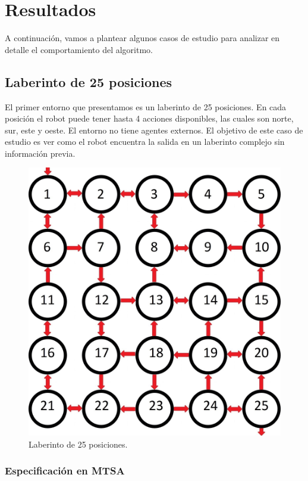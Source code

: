 \chapter{Resultados}

A continuación, vamos a plantear algunos casos de estudio para analizar en detalle el comportamiento del algoritmo.

\section{Laberinto de 25 posiciones}

El primer entorno que presentamos es un laberinto de 25 posiciones. En cada posición el robot puede tener hasta 4 
acciones disponibles, las cuales son norte, sur, este y oeste. El entorno no tiene agentes externos. El objetivo de 
este caso de estudio es ver como el robot encuentra la salida en un laberinto complejo sin información previa.

\begin{figure}[H]
	\centering
		\includegraphics[scale=0.2]{Imagenes/Laberintos/25.jpg}
	\caption{Laberinto de 25 posiciones.}
	\label{fig:25}
\end{figure}

\newpage
\subsection{Especificación en MTSA}

